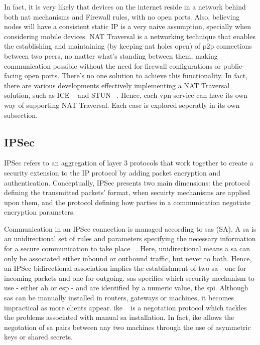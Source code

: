 \documentclass[11pt,twoside,a4paper]{report}
\begin{document}
In fact, it is very likely that devices on the internet reside in a network behind both \acrshort{nat} mechanisms and Firewall rules, with no open ports. Also, believing nodes will have a consistent static IP is a very naive assumption, specially when considering mobile devices. NAT Traversal is a networking technique that enables the establishing and maintaining (by keeping \acrshort{nat} holes open) of \acrshort{p2p} connections between two peers, no matter what's standing between them, making communication possible without the need for firewall configurations or public-facing open ports. There's no one solution to achieve this functionality. In fact, there are various developments effectively implementing a NAT Traversal solution, such as ICE ~\cite{rfc8445} and STUN ~\cite{rfc8489}. Hence, each \acrshort{vpn} service can have its own way of supporting NAT Traversal. Each case is explored seperatly in its own subsection.

\subsection{IPSec}

IPSec refers to an aggregation of layer 3 protocols that work together to create a security extension to the IP protocol by adding packet encryption and authentication. Conceptually, IPSec presents two main dimensions: the protocol defining the transmitted packets' format, when secuirty mechanisms are applied upon them, and the protocol defining how parties in a communication negotiate encryption parameters.

Communication in an IPSec connection is managed according to \acrlong{sa}s (SA). A \acrshort{sa} is an unidirectional set of rules and parameters specifying the necessary information for a secure communication to take place ~\cite{rfc4301}. Here, unidirectional means a \acrshort{sa} can only be associated either inbound or outbound traffic, but never to both. Hence, an IPSec bidirectional association implies the establishment of two \acrshort{sa} - one for incoming packets and one for outgoing. \acrshort{sa}s specifies which security mechanism to use - either \acrfull{ah} or \acrfull{esp} - and are identified by a numeric value, the \acrfull{spi}. Although \acrshort{sa}s can be manually installed in routers, gateways or machines, it becomes impractical as more clients appear. \acrfull{ike} ~\cite{rfc7296} is a negotation protocol which tackles the problems associated with manual \acrshort{sa} installation. In fact, \acrshort{ike} allows the negotation of \acrshort{sa} pairs between any two machines through the use of asymmetric keys or shared secrets.
\end{document}
